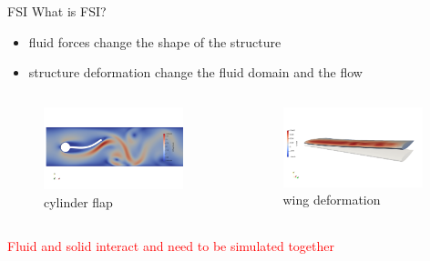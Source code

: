 \documentclass[10pt,t]{beamer}
\begin{document}
\begin{frame}{FSI}
What is FSI?

    \begin{itemize}
        \item fluid forces change the shape of the structure
        
        \item structure deformation change the fluid domain and the flow
    \end{itemize}
    

    \begin{columns}
        \begin{figure}
            \centering
            \includegraphics[width=0.95\textwidth,trim=0 100 0 100,clip]{images/flap1.png}
            \caption{cylinder flap}
        \end{figure}
        \begin{figure}
            \centering
            \includegraphics[width=0.95\textwidth,trim=0 100 0 100,clip]{images/naca.png}
            \caption{wing deformation}
        \end{figure}
    \end{columns}
    
    \pause
    
    
    \vskip 5mm
    
   \textcolor{red}{Fluid and solid interact and need to be simulated together}
    
    
\end{frame}
\end{document}
